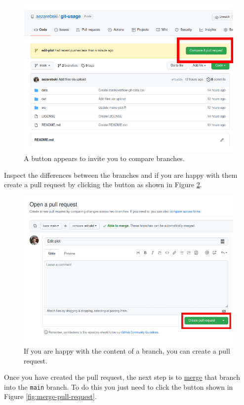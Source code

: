 \documentclass[11pt,onecolumn]{scrartcl}
\begin{document}
\begin{figure}[htbp]
\centering
\includegraphics[width=.9\linewidth]{./pull-request.png}
\caption{\label{fig:pull-request}A button appears to invite you to compare branches.}
\end{figure}

Inspect the differences between the branches and if you are happy with them
create a pull request by clicking the button as shown in Figure
\ref{fig:create-pull-request}.

\begin{figure}[htbp]
\centering
\includegraphics[width=.9\linewidth]{./create-pull-request.png}
\caption{\label{fig:create-pull-request}If you are happy with the content of a branch, you can create a pull request.}
\end{figure}

Once you have created the pull request, the next step is to \hyperref[sec:org1b8d383]{merge} that branch
into the \texttt{main} branch. To do this you just need to click the button shown in
Figure \ref{fig:merge-pull-request}.
\end{document}
